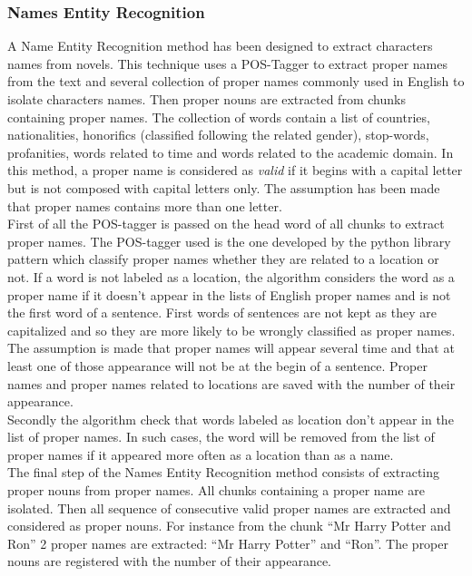 \documentclass[a4paper, 12pt]{report}
\begin{document}
\subsubsection{Names Entity Recognition}
A Name Entity Recognition method has been designed to extract characters names from novels. This technique uses a POS-Tagger to extract proper names from the text and several collection of proper names commonly used in English to isolate characters names. Then proper nouns are extracted from chunks containing proper names. The collection of words contain a list of countries, nationalities, honorifics (classified following the related gender), stop-words, profanities, words related to time and words related to the academic domain. In this method, a  proper name is considered as \textit{valid} if it begins with a capital letter but is not composed with capital letters only. The assumption has been made that proper names contains more than one letter.\\
First of all the POS-tagger is passed on the head word of all chunks to extract  proper names. The POS-tagger used is the one developed by the python library pattern which classify  proper names whether they are related to a location or not. If a word is not labeled as a location, the algorithm considers the word as a proper name if it doesn't appear in the lists of English  proper names and is not the first word of a sentence. First words of sentences are not kept as they are capitalized and so they are more likely to be wrongly classified as proper names. The assumption is made that proper names will appear several time and that at least one of those appearance will not be at the begin of a sentence. Proper names and  proper names related to locations are saved with the number of their appearance.\\
Secondly the algorithm check that words labeled as location don't appear in the list of proper names. In such cases, the word will be removed from the list of proper names if it appeared more often as a location than as a name.\\
The final step of the Names Entity Recognition method consists of extracting proper nouns from proper names. All chunks containing a proper name are isolated.   Then all sequence of consecutive valid  proper names are extracted and considered as proper nouns. For instance from the chunk ``Mr Harry Potter and Ron'' 2 proper names are extracted: ``Mr Harry Potter'' and ``Ron''. The proper nouns are registered with the number of their appearance.\\
\end{document}
